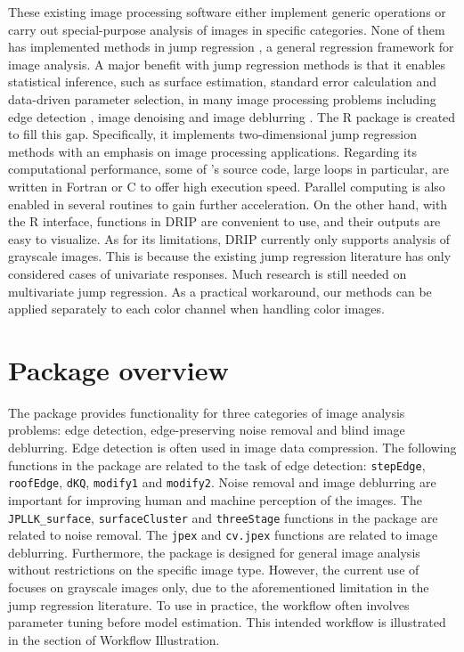 These existing image processing software either implement generic operations or carry out special-purpose analysis of images in specific categories. None of them has implemented methods in jump regression \citep{qiu2005image}, a general regression framework for image analysis. A major benefit with jump regression methods is that it enables statistical inference, such as surface estimation, standard error calculation and data-driven parameter selection, in many image processing problems including edge detection \citep{sun2007jump}, image denoising \citep{gijbels2006edge} and image deblurring \citep{hall2007blind}. The R package  is created to fill this gap. Specifically, it implements two-dimensional jump regression methods with an emphasis on image processing applications. Regarding its computational performance, some of 's source code, large loops in particular, are written in Fortran or C to offer high execution speed. Parallel computing is also enabled in several routines to gain further acceleration. On the other hand, with the R interface, functions in DRIP are convenient to use, and their outputs are easy to visualize. As for its limitations, DRIP currently only supports analysis of grayscale images. This is because the existing jump regression literature has only considered cases of univariate responses. Much research is still needed on multivariate jump regression. As a practical workaround, our methods can be applied separately to each color channel when handling color images.

\section{Package overview}\label{sec:overview}

The  package provides functionality for three categories of image analysis problems: edge detection, edge-preserving noise removal and blind image deblurring. Edge detection is often used in image data compression. The following functions in the package are related to the task of edge detection: \texttt{stepEdge}, \texttt{roofEdge}, \texttt{dKQ}, \texttt{modify1} and \texttt{modify2}. Noise removal and image deblurring are important for improving human and machine perception of the images. The \texttt{JPLLK\_surface}, \texttt{surfaceCluster} and \texttt{threeStage} functions in the package are related to noise removal. The \texttt{jpex} and \texttt{cv.jpex} functions are related to image deblurring. Furthermore, the package is designed for general image analysis without restrictions on the specific image type. However, the current use of  focuses on grayscale images only, due to the aforementioned limitation in the jump regression literature. To use  in practice, the workflow often involves parameter tuning before model estimation. This intended workflow is illustrated in the section of Workflow Illustration.

